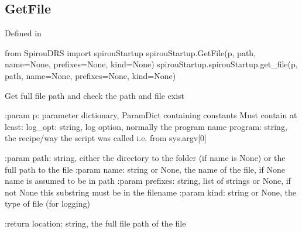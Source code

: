 \noindent\begin{minipage}{\textwidth}
\subsection{GetFile}

Defined in \spirouStartup{}

\begin{pythonbox}
from SpirouDRS import spirouStartup
spirouStartup.GetFile(p, path, name=None, prefixes=None, kind=None)
spirouStartup.spirouStartup.get_file(p, path, name=None, prefixes=None, kind=None)
\end{pythonbox}

\begin{pythondocstring}
  Get full file path and check the path and file exist

  :param p: parameter dictionary, ParamDict containing constants
      Must contain at least:
              log_opt: string, log option, normally the program name
              program: string, the recipe/way the script was called
                       i.e. from sys.argv[0]

  :param path: string, either the directory to the folder (if name is None) or
               the full path to the file
  :param name: string or None, the name of the file, if None name is assumed
               to be in path
  :param prefixes: string, list of strings or None, if not None this
                   substring must be in the filename
  :param kind: string or None, the type of file (for logging)

  :return location: string, the full file path of the file
\end{pythondocstring}
\end{minipage}


